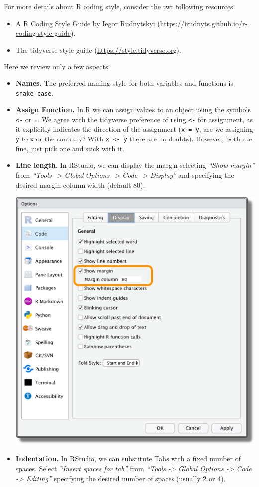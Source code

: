 \documentclass[
  11pt,
]{book}
\providecommand{\tightlist}{%
  \setlength{\itemsep}{0pt}\setlength{\parskip}{0pt}}
\begin{document}
For more details about R coding style, consider the two following resources:

\begin{itemize}
\tightlist
\item
  A R Coding Style Guide by Iegor Rudnytskyi (\url{https://irudnyts.github.io/r-coding-style-guide}).
\item
  The tidyverse style guide (\url{https://style.tidyverse.org}).
\end{itemize}

Here we review only a few aspects:

\begin{itemize}
\item
  \textbf{Names.} The preferred naming style for both variables and functions is \texttt{snake\_case}.
\item
  \textbf{Assign Function.} In R we can assign values to an object using the symbols \texttt{\textless{}-} or \texttt{=}. We agree with the tidyverse preference of using \texttt{\textless{}-} for assignment, as it explicitly indicates the direction of the assignment (\texttt{x\ =\ y}, are we assigning \texttt{y} to \texttt{x} or the contrary? With \texttt{x\ \textless{}-\ y} there are no doubts). However, both are fine, just pick one and stick with it.
\item
  \textbf{Line length.} In RStudio, we can display the margin selecting \emph{``Show margin''} from \emph{``Tools -\textgreater{} Global Options -\textgreater{} Code -\textgreater{} Display''} and specifying the desired margin column width (default 80).

  \begin{center}\includegraphics[width=0.6\linewidth]{images/coding/rstudio-line} \end{center}
\item
  \textbf{Indentation.} In RStudio, we can substitute Tabs with a fixed number of spaces. Select \emph{``Insert spaces for tab''} from \emph{``Tools -\textgreater{} Global Options -\textgreater{} Code -\textgreater{} Editing''} specifying the desired number of spaces (usually 2 or 4).


\end{itemize}
\end{document}
